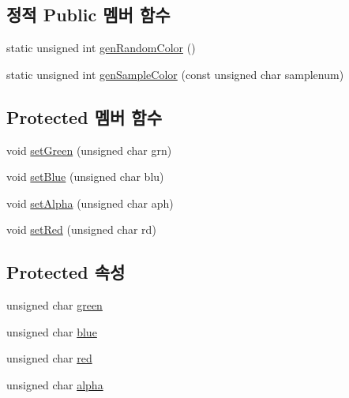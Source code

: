 \subsection*{정적 Public 멤버 함수}
\begin{DoxyCompactItemize}
\item 
static unsigned int \hyperlink{class_tetris_1_1_block_sub_modules_1_1_block_color_a74374a6d24cd77c7f4fe03e19111bab7}{gen\+Random\+Color} ()
\item 
static unsigned int \hyperlink{class_tetris_1_1_block_sub_modules_1_1_block_color_a624fe688c2889c345cb8dff757f06ef9}{gen\+Sample\+Color} (const unsigned char samplenum)
\end{DoxyCompactItemize}
\subsection*{Protected 멤버 함수}
\begin{DoxyCompactItemize}
\item 
void \hyperlink{class_tetris_1_1_block_sub_modules_1_1_block_color_aeea8ab6d5f36d35fd4f28818349661ab}{set\+Green} (unsigned char grn)
\item 
void \hyperlink{class_tetris_1_1_block_sub_modules_1_1_block_color_ac624156bd1f77a20d6e1d4c8cbff36d3}{set\+Blue} (unsigned char blu)
\item 
void \hyperlink{class_tetris_1_1_block_sub_modules_1_1_block_color_a5fdd2d1a53d92ec0bcc1c25748b890e0}{set\+Alpha} (unsigned char aph)
\item 
void \hyperlink{class_tetris_1_1_block_sub_modules_1_1_block_color_a9541e6b5b809214ae2691a99af06ac3f}{set\+Red} (unsigned char rd)
\end{DoxyCompactItemize}
\subsection*{Protected 속성}
\begin{DoxyCompactItemize}
\item 
unsigned char \hyperlink{class_tetris_1_1_block_sub_modules_1_1_block_color_a4b28885bfd8bf53793c6b3daedd974eb}{green}
\item 
unsigned char \hyperlink{class_tetris_1_1_block_sub_modules_1_1_block_color_af04e78b9a1c2f7625863c289c4a741e3}{blue}
\item 
unsigned char \hyperlink{class_tetris_1_1_block_sub_modules_1_1_block_color_af8a0dc372e7dbab300290eadada8ef49}{red}
\item 
unsigned char \hyperlink{class_tetris_1_1_block_sub_modules_1_1_block_color_af0983ea684f33617a0b482cfea1d3c2b}{alpha}
\end{DoxyCompactItemize}


